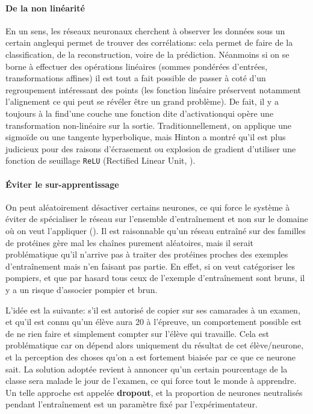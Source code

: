 \documentclass[a4paper, 11pt, onecolumn]{article}
\begin{document}
\paragraph{De la non linéarité}

En un sens, les réseaux neuronaux cherchent à observer les données \og sous un
certain angle\fg qui permet de trouver des corrélations: cela permet de faire de
la classification, de la reconstruction, voire de la prédiction. Néanmoins si on
se borne à effectuer des opérations linéaires (sommes pondérées
d'entrées, transformations affines) il est tout a fait possible de passer à coté
d'un regroupement intéressant des points (les fonction linéaire préservent
notamment l'alignement ce qui peut se révéler être un grand problème). De fait,
il y a toujours \og à la fin\fg d'une couche une fonction dite \og
d'activation\fg qui opère une transformation non-linéaire sur la sortie.
Traditionnellement, on applique une sigmoïde ou une tangente hyperbolique, mais
Hinton a montré qu'il est plus judicieux pour des raisons d'écrasement ou
explosion de gradient d'utiliser une fonction de seuillage
\texttt{ReLU} (Rectified Linear Unit, \cite{glorot2011deep}).

\paragraph{Éviter le sur-apprentissage}
  
On peut aléatoirement désactiver certains neurones, ce qui force le système à
 éviter de spécialiser le réseau sur l'ensemble d'entraînement et non sur
le domaine où on veut l'appliquer (\cite{srivastava2014dropout}). Il est raisonnable qu'un réseau
entraîné sur des familles de protéines gère mal les chaînes purement
aléatoires, mais il serait problématique qu'il n'arrive pas à
traiter des protéines proches des exemples d'entraînement mais n'en faisant
pas partie. En effet, si on veut catégoriser les pompiers, et que par hasard
tous ceux de l'exemple d'entraînement sont bruns, il y a un risque d'associer
pompier et brun.

L'idée est la suivante: s'il est autorisé de copier sur ses camarades à un
examen, et qu'il est connu qu'un élève aura 20 à l'épreuve, un comportement
possible est de ne rien faire et simplement compter sur l'élève qui travaille.
Cela est problématique car on dépend alors uniquement du résultat de cet
élève/neurone, et la perception des choses qu'on a est fortement biaisée par ce
que ce neurone sait. La solution adoptée revient à annoncer qu'un certain
pourcentage de la classe sera malade le jour de l'examen, ce qui force tout le
monde à apprendre. Un telle approche est appelée \textbf{dropout}, et la
proportion de neurones neutralisés pendant l'entraînement est un paramètre fixé
par l'expérimentateur.
\end{document}
